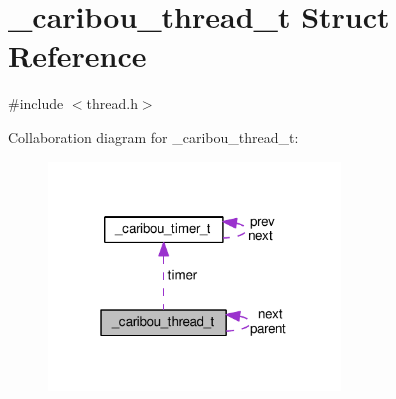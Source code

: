 \hypertarget{struct__caribou__thread__t}{\section{\-\_\-caribou\-\_\-thread\-\_\-t Struct Reference}
\label{struct__caribou__thread__t}
}


{\ttfamily \#include $<$thread.\-h$>$}



Collaboration diagram for \-\_\-caribou\-\_\-thread\-\_\-t\-:
\nopagebreak
\begin{figure}[H]
\begin{center}
\leavevmode
\includegraphics[width=220pt]{struct__caribou__thread__t__coll__graph}
\end{center}
\end{figure}
